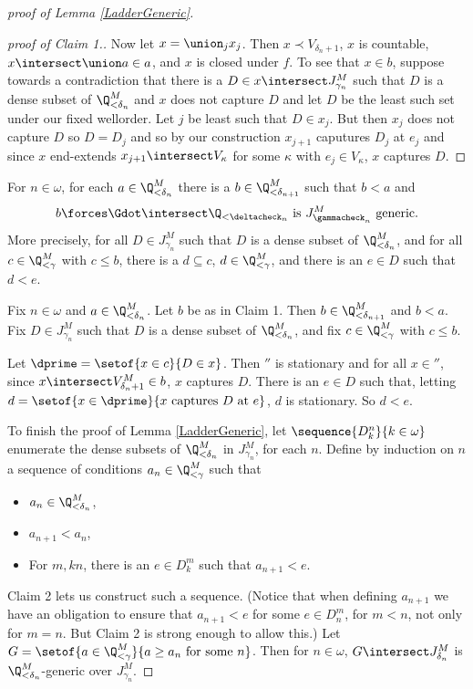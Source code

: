 \documentclass[oneside,12pt]{amsart}
\begin{document}
\begin{proof}[proof of Lemma  \ref{LadderGeneric}]
\begin{proof}[proof of Claim 1.]
Now let $x=\union_j x_j$. Then
$x \prec V_{\delta_n+1}$, $x$ is countable,
$x\intersect\union a \in a$, and $x$ is closed under  $f$. To see that $x\in b$,
 suppose towards a contradiction that there is a $D\in x\intersect J^M_{\gamma_n}$ such that $D$ is a dense subset of $\Q_{<\delta_n}^M$ and $x$ does not capture
$D$ and let $D$ be the least such set under our fixed wellorder. Let $j$ be least such that $D\in x_j$. But then $x_j$ does not capture $D$ so $D=D_j$ and so by our construction $x_{j+1}$ caputures
$D_j$ at $e_j$ and since $x$ end-extends $x_{j+1}\intersect V_{\kappa}$ for some $\kappa$
with $e_j\in V_{\kappa}$, $x$ captures $D$.
\end{proof}

\begin{claim}[Claim 2]
For $n\in\omega$, for each $a\in \Q_{<\delta_n}^M$ there is a $b\in \Q_{<\delta_{n+1}}^M$ such
that $b < a$ and
$$b\forces\Gdot\intersect \Q_{<\deltacheck_n}\text{ is } J^M_{\gammacheck_n}\text{ generic.}$$
More precisely,
for all $D\in J^M_{\gamma_n}$ such that $D$ is a dense
subset of $\Q_{<\delta_n}^M$, and for all $c\in \Q_{<\gamma}^M$ with
$c\leq b$, there is a $d\subseteq c$, $d\in \Q_{<\gamma}^M$, and
there is an $e\in D$ such that $d < e$.
\end{claim}
\begin{subproof}
Fix $n\in\omega$ and $a\in \Q_{<\delta_n}^M$. Let $b$ be as in Claim 1.
Then $b\in \Q_{<\delta_{n+1}}^M$ and
$b<a$. Fix $D\in J^M_{\gamma_n}$ such that $D$ is a dense
subset of $\Q_{<\delta_n}^M$, and fix $c\in \Q_{<\gamma}^M$ with
$c\leq b$.

Let $\dprime=\setof{x\in c}{D\in x}$. Then $\dprime$ is stationary
and for all $x\in\dprime$, since $x\intersect V^M_{\delta_n+1}\in b$,
$x$ captures $D$. There is an $e\in D$ such that, letting
$d=\setof{x\in\dprime}{x \text{ captures } D \text{ at } e}$, $d$ is stationary.
So $d<e$.
\end{subproof}

To finish the proof of Lemma  \ref{LadderGeneric}, let
$\sequence{D^n_k}{k\in\omega}$ enumerate the dense subsets of
$\Q_{<\delta_n}^M$ in $J^M_{\gamma_n}$, for each $n$. Define by induction on
$n$ a sequence of conditions $a_n\in\Q_{<\gamma}^M$ such that
\begin{itemize}
\item $a_n\in\Q^M_{<\delta_n}$,
\item $a_{n+1} < a_n$,
\item For $m,k  n$, there is an $e\in D^m_k$ such that $a_{n+1}<e$.
\end{itemize}
Claim 2 lets us construct such a sequence. (Notice that when defining
$a_{n+1}$ we have an obligation to ensure that $a_{n+1}<e$ for some
$e\in D^m_n$, for $m<n$, not only for $m=n$. But Claim 2 is strong enough
to allow this.)
Let $G=\setof{a\in \Q_{<\gamma}^M}{a\geq a_n \text{ for some } n}$.
Then for $n\in\omega$,
$G\intersect J^M_{\delta_n}$ is $\Q_{<\delta_n}^M$-generic over $J^M_{\gamma_n}$.

\end{proof}
\end{document}
